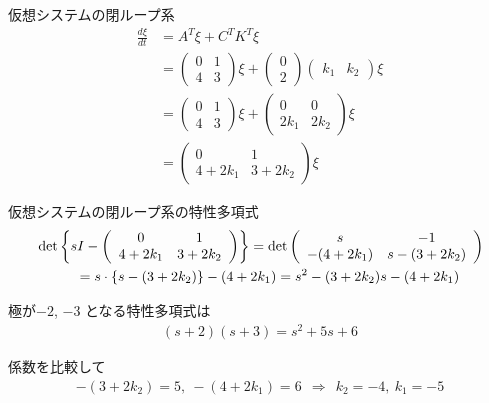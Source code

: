 \documentclass[a4paper,11pt,fleqn]{jreport}
\def\det{\mathop{\rm det}\nolimits}
\begin{document}
仮想システムの閉ループ系
\begin{align*}
 \frac{d \xi}{dt} & = A^T \xi + C^T K^T \xi
\\
	&=
	\left (
	\begin{array}{cc}
	 0 & 1 \\
	 4 & 3
	\end{array}
	\right )
	\xi
	+
	\left (
	\begin{array}{c}
	 0 \\ 2 
	\end{array}
	\right )
	\left ( \begin{array}{cc}
		k_1 & k_2 
	\end{array} \right )
	\xi
\\
	&=
	\left (
	\begin{array}{cc}
	 0 & 1 \\
	 4 & 3
	\end{array}
	\right )
	\xi
	+
	\left (
	\begin{array}{cc}
	 0 & 0 \\ 2k_1 & 2k_2 
	\end{array}
	\right )
	\xi
\\
	&=
	\left (
	\begin{array}{cc}
	 0 & 1 \\
	 4 + 2k_1 & 3 + 2k_2
	\end{array}
	\right )
	\xi
\end{align*}

仮想システムの閉ループ系の特性多項式
\begin{align*}
	&\det
	\left \{
		sI- 
		\left ( 
		\begin{array}{cc}
		 0 & 1 \\
		 4 + 2k_1 & 3 + 2k_2
		\end{array}
		\right )
	\right \}
	=
	\det
	\left ( 
	\begin{array}{cc}
	 s & -1 \\
	 -(4 + 2k_1) & s-(3 + 2k_2)
	\end{array}
	\right )
\\
	& \hspace{1cm} =
	s \cdot \{ s-(3 + 2k_2) \} -(4 + 2k_1)
	=
	s^2 -(3 + 2k_2)s -(4 + 2k_1)
\end{align*}

極が$-2$, $-3$ となる特性多項式は
\begin{align*}
	(s+2)(s+3) = s^2+5s+6
\end{align*}

係数を比較して
\begin{align*}
	-(3 + 2k_2)=5, \ -(4 + 2k_1)=6 
	\ \ \Rightarrow \ \ 
	k_2=-4, \ k_1=-5
\end{align*}
\end{document}
